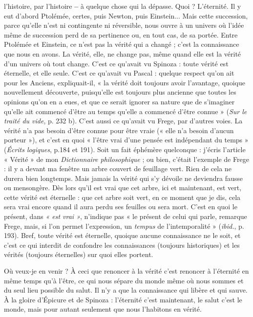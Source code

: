 l’histoire, par l’histoire {\bf --} à quelque chose qui la dépasse. Quoi ? L’éternité. Il y
eut d’abord Ptolémée, certes, puis Newton, puis Einstein... Mais cette succession,
parce qu’elle n’est ni contingente ni réversible, nous ouvre à un univers où
l’idée même de succession perd de sa pertinence ou, en tout cas, de sa portée.
Entre Ptolémée et Einstein, ce n’est pas la vérité qui a changé ; c’est la connaissance
que nous en avons. La vérité, elle, ne change pas, même quand elle est la
vérité d’un univers où tout change. C’est ce qu'avait vu Spinoza : toute vérité
est éternelle, et elle seule. C’est ce qu'avait vu Pascal : quelque respect qu’on ait
pour les Anciens, expliquait-il, « la vérité doit toujours avoir l’avantage,
quoique nouvellement découverte, puisqu’elle est toujours plus ancienne que
toutes les opinions qu’on en a eues, et que ce serait ignorer sa nature que de
s’imaginer qu’elle ait commencé d’être au temps qu’elle a commencé d’être
connue » ({\it Sur le traité du vide}, p. 232 b). C’est aussi ce qu'avait vu Frege, par
d’autres voies. La vérité n’a pas besoin d’être connue pour être vraie (« elle n’a
besoin d’aucun porteur »), et c’est en quoi « l’être vrai d’une pensée est indépendant
du temps » ({\it Écrits logiques}, p.184 et 191). Soit un fait éphémère
quelconque : j'écris l’article « Vérité » de mon {\it Dictionnaire philosophique} ; ou
bien, c'était l'exemple de Frege : il y a devant ma fenêtre un arbre couvert de
feuillage vert. Rien de cela ne durera bien longtemps. Mais jamais la vérité qui
s’y dévoile ne deviendra fausse ou mensongère. Dès lors qu’il est vrai que cet
arbre, ici et maintenant, est vert, cette vérité est éternelle : que cet arbre soit
vert, en ce moment que je dis, cela sera vrai encore quand il aura perdu ses
feuilles ou sera mort. C’est en quoi le présent, dans {\it « est vrai »}, n’indique pas
« le présent de celui qui parle, remarque Frege, mais, si l’on permet l’expression,
un {\it tempus} de l’intemporalité » ({\it ibid.}, p. 193). Bref, toute vérité est éternelle,
quoique aucune connaissance ne le soit, et c’est ce qui interdit de
confondre les connaissances (toujours historiques) et les vérités (toujours éternelles)
sur quoi elles portent.

Où veux-je en venir ? À ceci que renoncer à la vérité c’est renoncer à
l'éternité en même temps qu’à l’être, ce qui nous sépare du monde même où
nous sommes et du seul lieu possible du salut. Il n’y a que la connaissance qui
libère et qui sauve. À la gloire d’Épicure et de Spinoza : l'éternité c’est maintenant,
le salut c’est le monde, mais pour autant seulement que nous l’habitons
en vérité.

